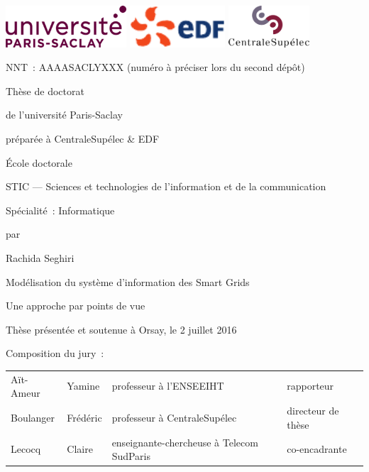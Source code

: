 \begin{titlepage}
\sffamily
\vspace*{-2cm}
\includegraphics[height=1.55cm]{logo/ParisSaclay}\hfill
\includegraphics[height=1.55cm]{logo/Logo_EDF}\hfill
\includegraphics[height=1.55cm]{logo/CentraleSupelec}

\bigskip
NNT~: AAAASACLYXXX (numéro à préciser lors du second dépôt)

\bigskip

\bigskip

\begin{center}
\huge

Thèse de doctorat

de l'université Paris-Saclay

\bigskip

préparée à CentraleSupélec \& EDF

\bigskip
\Large
École doctorale 

{\large STIC --- Sciences et technologies de l'information et de la communication}

\bigskip
Spécialité~: Informatique

\bigskip

par

\medskip
\Large
Rachida Seghiri

\bigskip

{\LARGE
Modélisation du système d'information des Smart Grids

Une approche par points de vue
}

\end{center}

\bigskip
\bigskip
\large
Thèse présentée et soutenue à Orsay, le 2 juillet 2016

\medskip
Composition du jury~:

\smallskip
\begin{center}
\begin{tabular}{@{}llll}
Aït-Ameur & Yamine & professeur à l'ENSEEIHT & rapporteur \\
Boulanger & Frédéric & professeur à CentraleSupélec & directeur de thèse \\
Lecocq & Claire & enseignante-chercheuse à Telecom SudParis & co-encadrante \\
\end{tabular}

\end{center}

\end{titlepage}
\restoregeometry
\thispagestyle{empty}
\cleardoublepage
